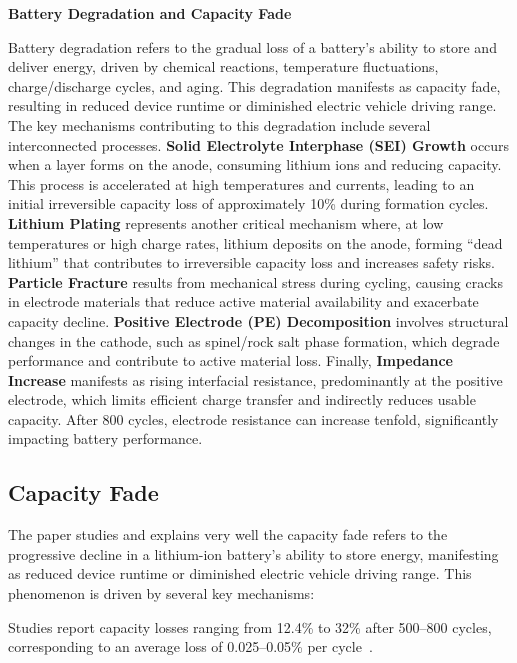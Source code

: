 \vspace{1cm}

\textbf{Battery Degradation and Capacity Fade}

Battery degradation refers to the gradual loss of a battery's ability to store and deliver energy, driven by chemical reactions, temperature fluctuations, charge/discharge cycles, and aging. This degradation manifests as capacity fade, resulting in reduced device runtime or diminished electric vehicle driving range. The key mechanisms contributing to this degradation include several interconnected processes. \textbf{Solid Electrolyte Interphase (SEI) Growth} occurs when a layer forms on the anode, consuming lithium ions and reducing capacity. This process is accelerated at high temperatures and currents, leading to an initial irreversible capacity loss of approximately 10\% during formation cycles. \textbf{Lithium Plating} represents another critical mechanism where, at low temperatures or high charge rates, lithium deposits on the anode, forming ``dead lithium'' that contributes to irreversible capacity loss and increases safety risks. \textbf{Particle Fracture} results from mechanical stress during cycling, causing cracks in electrode materials that reduce active material availability and exacerbate capacity decline. \textbf{Positive Electrode (PE) Decomposition} involves structural changes in the cathode, such as spinel/rock salt phase formation, which degrade performance and contribute to active material loss. Finally, \textbf{Impedance Increase} manifests as rising interfacial resistance, predominantly at the positive electrode, which limits efficient charge transfer and indirectly reduces usable capacity. After 800 cycles, electrode resistance can increase tenfold, significantly impacting battery performance.
\vspace{1cm}
\subsection{Capacity Fade}
The \cite{zhang_studies_2000} paper studies and explains very well the capacity fade refers to the progressive decline in a lithium-ion battery’s ability to store energy, manifesting as reduced device runtime or diminished electric vehicle driving range. This phenomenon is driven by several key mechanisms:



Studies report capacity losses ranging from 12.4\% to 32\% after 500--800 cycles, corresponding to an average loss of 0.025--0.05\% per cycle~\cite{zhang_studies_2000}.


